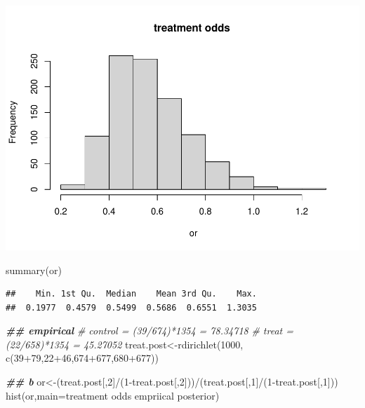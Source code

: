 \documentclass[
]{book}
\newenvironment{Shaded}{\begin{snugshade}}{\end{snugshade}}
\newcommand{\AttributeTok}[1]{\textcolor[rgb]{0.77,0.63,0.00}{#1}}
\newcommand{\CommentTok}[1]{\textcolor[rgb]{0.56,0.35,0.01}{\textit{#1}}}
\newcommand{\DecValTok}[1]{\textcolor[rgb]{0.00,0.00,0.81}{#1}}
\newcommand{\DocumentationTok}[1]{\textcolor[rgb]{0.56,0.35,0.01}{\textbf{\textit{#1}}}}
\newcommand{\FunctionTok}[1]{\textcolor[rgb]{0.00,0.00,0.00}{#1}}
\newcommand{\NormalTok}[1]{#1}
\newcommand{\OtherTok}[1]{\textcolor[rgb]{0.56,0.35,0.01}{#1}}
\newcommand{\SpecialCharTok}[1]{\textcolor[rgb]{0.00,0.00,0.00}{#1}}
\newcommand{\StringTok}[1]{\textcolor[rgb]{0.31,0.60,0.02}{#1}}
\theoremstyle{definition}
\theoremstyle{definition}
\theoremstyle{definition}
\theoremstyle{definition}
\theoremstyle{remark}
\begin{document}
\includegraphics{_main_files/figure-latex/unnamed-chunk-38-1.pdf}

\begin{Shaded}
\begin{Highlighting}[]
  \FunctionTok{summary}\NormalTok{(or)}
\end{Highlighting}
\end{Shaded}

\begin{verbatim}
##    Min. 1st Qu.  Median    Mean 3rd Qu.    Max. 
##  0.1977  0.4579  0.5499  0.5686  0.6551  1.3035
\end{verbatim}

\begin{Shaded}
\begin{Highlighting}[]
  \DocumentationTok{\#\# empirical}
  \CommentTok{\# control = (39/674)*1354 = 78.34718}
  \CommentTok{\# treat = (22/658)*1354 = 45.27052}
\NormalTok{  treat.post}\OtherTok{\textless{}{-}}\FunctionTok{rdirichlet}\NormalTok{(}\DecValTok{1000}\NormalTok{, }\FunctionTok{c}\NormalTok{(}\DecValTok{39}\SpecialCharTok{+}\DecValTok{79}\NormalTok{,}\DecValTok{22}\SpecialCharTok{+}\DecValTok{46}\NormalTok{,}\DecValTok{674}\SpecialCharTok{+}\DecValTok{677}\NormalTok{,}\DecValTok{680}\SpecialCharTok{+}\DecValTok{677}\NormalTok{))}
 
  
  \DocumentationTok{\#\# b}
\NormalTok{  or}\OtherTok{\textless{}{-}}\NormalTok{(treat.post[,}\DecValTok{2}\NormalTok{]}\SpecialCharTok{/}\NormalTok{(}\DecValTok{1}\SpecialCharTok{{-}}\NormalTok{treat.post[,}\DecValTok{2}\NormalTok{]))}\SpecialCharTok{/}\NormalTok{(treat.post[,}\DecValTok{1}\NormalTok{]}\SpecialCharTok{/}\NormalTok{(}\DecValTok{1}\SpecialCharTok{{-}}\NormalTok{treat.post[,}\DecValTok{1}\NormalTok{]))}
  \FunctionTok{hist}\NormalTok{(or,}\AttributeTok{main=}\StringTok{\textquotesingle{}treatment odds empriical posterior\textquotesingle{}}\NormalTok{)}
\end{Highlighting}
\end{Shaded}
\end{document}
